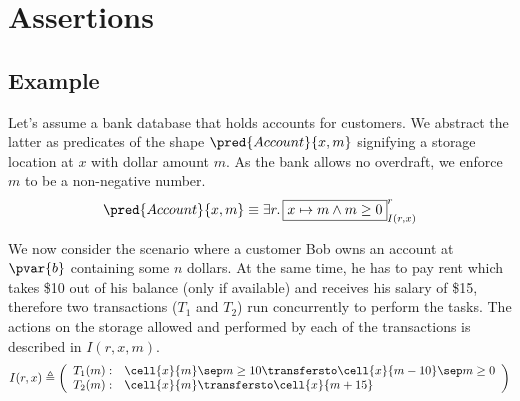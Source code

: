 \section{Assertions}

\subsection{Example}

Let's assume a bank database that holds accounts for customers. We abstract the latter as predicates of the shape $\pred{Account}{x, m}$ signifying a storage location at $x$ with dollar amount $m$. As the bank allows no overdraft, we enforce $m$ to be a non-negative number.
\[
\pred{Account}{x, m} \equiv \exists r \ldotp \boxed{x \mapsto m \land m \geq 0}^r_{I(r, x)}
\]

We now consider the scenario where a customer Bob owns an account at $\pvar{b}$ containing some $n$ dollars. At the same time, he has to pay rent which takes \$10 out of his balance (only if available) and receives his salary of \$15, therefore two transactions ($T_1$ and $T_2$) run concurrently to perform the tasks. The actions on the storage allowed and performed by each of the transactions is described in $I(r, x, m)$.
\[
I(r, x) \triangleq \left( 
\begin{array}{r l}
T_1(m): & \cell{x}{m} \sep m \geq 10 \transfersto \cell{x}{m - 10} \sep m \geq 0 \\
T_2(m): & \cell{x}{m} \transfersto \cell{x}{m + 15}
\end{array}
 \right)
\]

